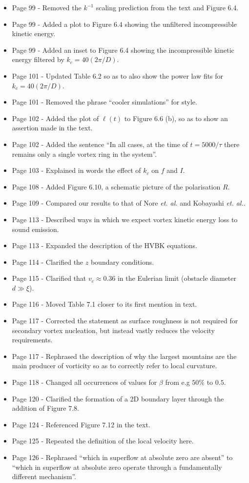 \documentclass{article}
\begin{document}
\begin{itemize}
\item Page 99 - Removed the $k^{-1}$ scaling prediction from the text and Figure 6.4.
\item Page 99 - Added a plot to Figure 6.4 showing the unfiltered incompressible kinetic energy.
\item Page 99 - Added an inset to Figure 6.4 showing the incompressible kinetic energy filtered by $k_c=40 (2\pi/D)$.
\item Page 101 - Updated Table 6.2 so as to also show the power law fits for $k_c = 40 (2\pi/D)$.
\item Page 101 - Removed the phrase ``cooler simulations'' for style.
\item Page 102 - Added the plot of $\ell(t)$ to Figure 6.6 (b), so as to show an assertion made in the text.
\item Page 102 - Added the sentence ``In all cases, at the time of $t=5000/\tau$ there remains only a single vortex ring in the system''.
\item Page 103 - Explained in words the effect of $k_c$ on $f$ and $I$.
\item Page 108 - Added Figure 6.10, a schematic picture of the polarisation $R$.
\item Page 109 - Compared our results to that of Nore {\it et. al.} and Kobayashi {\it et. al.}.
\item Page 113 - Described ways in which we expect vortex kinetic energy loss to sound emission.
\item Page 113 - Expanded the description of the HVBK equations.
\item Page 114 - Clarified the $z$ boundary conditions.
\item Page 115 - Clarified that $v_c \approx 0.36$ in the Eulerian limit (obstacle diameter $d \gg \xi$).
\item Page 116 - Moved Table 7.1 closer to its first mention in text.
\item Page 117 - Corrected the statement as surface roughness is not required for secondary vortex nucleation, but instead vastly reduces the velocity requirements.
\item Page 117 - Rephrased the description of why the largest mountains are the main producer of vorticity so as to correctly refer to local curvature.
\item Page 118 - Changed all occurrences of values for $\beta$ from e.g $50\%$ to $0.5$.
\item Page 120 - Clarified the formation of a 2D boundary layer through the addition of Figure 7.8.
\item Page 124 - Referenced Figure 7.12 in the text.
\item Page 125 - Repeated the definition of the local velocity here.
\item Page 126 - Rephrased ``which in superflow at absolute zero are absent'' to ``which in superflow at absolute zero operate through a fundamentally different mechanism''.


\end{itemize}
\end{document}
